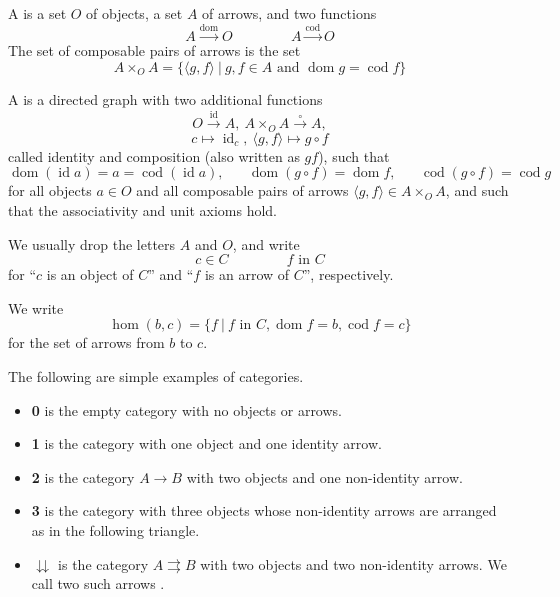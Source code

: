 \documentclass{mathnotes}
\DeclareMathOperator{\dom}{dom}
\DeclareMathOperator{\cod}{cod}
\DeclareMathOperator{\id}{id}
\begin{document}
\begin{defi}
  A  is a set $O$ of objects, a set $A$ of arrows, and
  two functions
  \[A\xrightarrow{\dom}O\hspace{50pt}A\xrightarrow{\cod}O\]
  The set of composable pairs of arrows is the set
  \[A\times_OA=\{\langle g,f\rangle\ |\ g,f\in A
  \text{ and }\dom g=\cod f\}\]
\end{defi}

\begin{bdefi}
  A  is a directed graph with two additional functions
  \[O\xrightarrow{\id}A,\ A\times_OA\xrightarrow{\circ}A,\]
  \[c\mapsto\id_c,\ \langle g,f\rangle\mapsto g\circ f\]
  called identity and composition (also written as $gf$), such that
  \[\dom(\id a)=a=\cod(\id a),\hspace{20pt}\dom(g\circ
  f)=\dom f,\hspace{20pt}\cod(g\circ f)=\cod g\]
  for all objects $a\in O$ and all composable pairs of arrows $\langle
  g,f\rangle\in A\times_OA$, and such that the associativity and unit axioms
  hold.
\end{bdefi}

\begin{note}
  We usually drop the letters $A$ and $O$, and write
  \[c\in C\hspace{50pt}f\text{ in }C\]
  for ``$c$ is an object of $C$'' and ``$f$ is an arrow of $C$'', respectively.
\end{note}

\begin{defi}
  We write
  \[\hom(b,c)=\{f\ |\ f\text{ in }C,\dom f=b, \cod f=c\}\]
  for the set of arrows from $b$ to $c$.
\end{defi}

\begin{ex}
  The following are simple examples of categories.
  \begin{itemize}
    \item \textbf{0} is the empty category with no objects or arrows.
    \item \textbf{1} is the category with one object and one identity arrow.
    \item \textbf{2} is the category $A\rightarrow B$ with two objects and one
      non-identity arrow.
    \item \textbf{3} is the category with three objects whose non-identity
      arrows are arranged as in the following triangle.
      \begin{center}
      \end{center}
    \item $\downdownarrows$ is the category $A\rightrightarrows B$ with two
      objects and two non-identity arrows. We call two such arrows
      .
  \end{itemize}
\end{ex}
\end{document}

